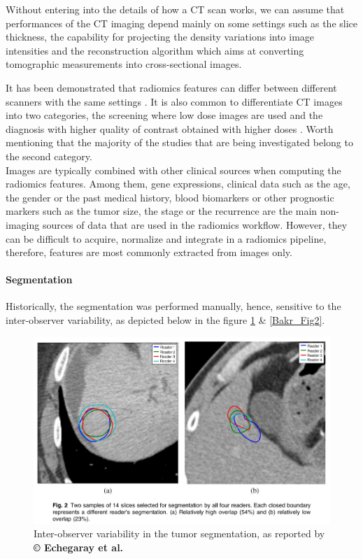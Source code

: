 \documentclass[]{article}
\let\oldparagraph\paragraph
\renewcommand{\paragraph}[1]{\oldparagraph{#1}\mbox{}}
\begin{document}
Without entering into the details of how a CT scan works, we can assume
that performances of the CT imaging depend mainly on some settings such
as the slice thickness, the capability for projecting the density
variations into image intensities and the reconstruction algorithm which
aims at converting tomographic measurements into cross-sectional images.

It has been demonstrated that radiomics features can differ between
different scanners with the same settings \cite{Berenguer2018}. It is also common to differentiate CT images into two
categories, the screening where low dose images are used and the
diagnosis with higher quality of contrast obtained with higher doses \cite{Thawani2018}. Worth mentioning that the
majority of the studies that are being investigated belong to the second
category.\\
Images are typically combined with other clinical sources when computing
the radiomics features. Among them, gene expressions, clinical data such
as the age, the gender or the past medical history, blood biomarkers or
other prognostic markers such as the tumor size, the stage or the
recurrence are the main non-imaging sources of data that are used in the
radiomics workflow. However, they can be difficult to acquire, normalize
and integrate in a radiomics pipeline, therefore, features are most
commonly extracted from images only.

\paragraph{Segmentation}\label{segmentation}

Historically, the segmentation was performed manually, hence, sensitive
to the inter-observer variability, as depicted below in the figure \ref{Echegaray_Fig2} \& \ref{Bakr_Fig2}.
\begin{figure}[th!]
	\centering
	\includegraphics[width=0.7\linewidth]{images/image11}
	\caption{Inter-observer variability in the tumor segmentation, as reported by \textbf{© Echegaray et al.} \cite{Echegaray2015}}
	\label{Echegaray_Fig2}
\end{figure}
\end{document}
